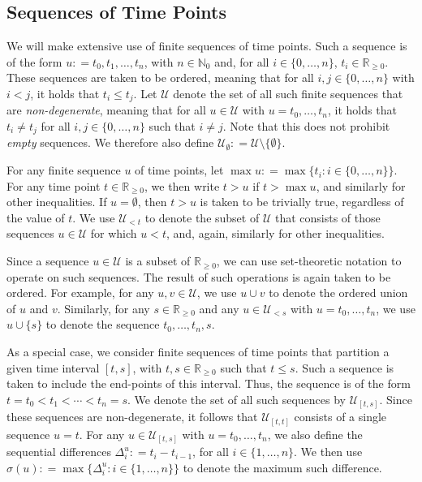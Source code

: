 \documentclass[10pt,a4paper]{paper}
\theoremstyle{definition}
\newcommand{\nats}{\mathbb{N}}
\newcommand{\natswith}{\nats_{0}}
\newcommand{\reals}{\mathbb{R}}
\newcommand{\realsnonneg}{\reals_{\geq 0}}
\newcommand{\coloneqq}{:\!=}
\begin{document}
\subsection{Sequences of Time Points}

We will make extensive use of finite sequences of time points. Such a sequence is of the form $u\coloneqq t_0,t_1,\ldots,t_n$, with $n\in\natswith$ and, for all $i\in\{0,\ldots,n\}$, $t_i\in\realsnonneg$. These sequences are taken to be ordered, meaning that for all $i,j\in\{0,\ldots,n\}$ with $i<j$, it holds that $t_i\leq t_j$. Let $\mathcal{U}$ denote the set of all such finite sequences that are \emph{non-degenerate}, meaning that for all $u\in\mathcal{U}$ with $u=t_0,\ldots,t_n$, it holds that $t_i\neq t_j$ for all $i,j\in\{0,\ldots,n\}$ such that $i\neq j$. Note that this does not prohibit \emph{empty} sequences. We therefore also define $\mathcal{U}_\emptyset\coloneqq \mathcal{U}\setminus\{\emptyset\}$.

For any finite sequence $u$ of time points, let $\max u\coloneqq \max\{t_i:i\in\{0,\ldots,n\}\}$. For any time point $t\in\realsnonneg$, we then write $t>u$ if $t>\max u$, and similarly for other inequalities. If $u=\emptyset$, then $t>u$ is taken to be trivially true, regardless of the value of $t$. We use $\mathcal{U}_{<t}$ to denote the subset of $\mathcal{U}$ that consists of those sequences $u\in\mathcal{U}$ for which $u<t$, and, again, similarly for other inequalities.

Since a sequence $u\in\mathcal{U}$ is a subset of $\realsnonneg$, we can use set-theoretic notation to operate on such sequences. The result of such operations is again taken to be ordered. For example, for any $u,v\in\mathcal{U}$, we use $u\cup v$ to denote the ordered union of $u$ and $v$. Similarly, for any $s\in\realsnonneg$ and any $u\in\mathcal{U}_{<s}$ with $u=t_0,\ldots,t_n$, we use $u\cup\{s\}$ to denote the sequence $t_0,\ldots,t_n,s$.

As a special case, we consider finite sequences of time points that partition a given time interval $[t,s]$, with $t,s\in\realsnonneg$ such that $t\leq s$. Such a sequence is taken to include the end-points of this interval.  Thus, the sequence is of the form $t=t_0< t_1<\cdots< t_n=s$. We denote the set of all such sequences by $\mathcal{U}_{[t,s]}$. Since these sequences are non-degenerate, it follows that $\mathcal{U}_{[t,t]}$ consists of a single sequence $u=t$. For any $u\in\mathcal{U}_{[t,s]}$ with $u=t_0,\ldots,t_n$, we also define the sequential differences $\Delta_i^u\coloneqq t_i-t_{i-1}$, for all $i\in\{1,\ldots,n\}$. We then use $\sigma(u)\coloneqq \max\{\Delta_i^u:i\in\{1,\ldots,n\}\}$ to denote the maximum such difference.
\end{document}

